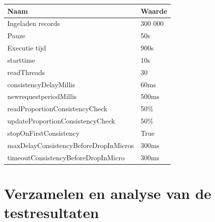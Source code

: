 \begin{table}[t]
	\centering
		\begin{tabular}{l|l}
			\textbf{Naam} & \textbf{Waarde} \\ \hline
			Ingeladen records  & 300 000 \\
			Pauze & 50s \\
			Executie tijd & 900s \\	
			starttime & 10s \\
			readThreads & 30 \\ 
			consistencyDelayMillis & 60ms \\ 
			newrequestperiodMillis & 500ms \\ 
			readProportionConsistencyCheck & 50\% \\ 
			updateProportionConsistencyCheck & 50\% \\ 
			stopOnFirstConsistency & True \\ 
			maxDelayConsistencyBeforeDropInMicros & 300ms \\ 
			timeoutConsistencyBeforeDropInMicro & 300ms \\
		\end{tabular} 
	\label{table:consistentie-testen-parameters}
\end{table}

\section{Verzamelen en analyse van de testresultaten}


